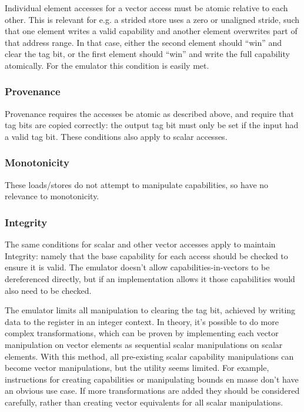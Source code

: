 Individual element accesses for a vector access must be atomic relative to each other.
This is relevant for e.g. a strided store uses a zero or unaligned stride, such that one element writes a valid capability and another element overwrites part of that address range.
In that case, either the second element should ``win'' and clear the tag bit, or the first element should ``win'' and write the full capability atomically.
For the emulator this condition is easily met.

\subsubsection*{Provenance}
Provenance requires the accesses be atomic as described above, and require that tag bits are copied correctly: the output tag bit must only be set if the input had a valid tag bit.
These conditions also apply to scalar accesses.

\subsubsection*{Monotonicity}
These loads/stores do not attempt to manipulate capabilities, so have no relevance to monotonicity.

\subsubsection*{Integrity}
The same conditions for scalar and other vector accesses apply to maintain Integrity: namely that the base capability for each access should be checked to ensure it is valid.
The emulator doesn't allow capabilities-in-vectors to be dereferenced directly, but if an implementation allows it those capabilities would also need to be checked.

The emulator limits all manipulation to clearing the tag bit, achieved by writing data to the register in an integer context.
In theory, it's possible to do more complex transformations, which can be proven by implementing each vector manipulation on vector elements as sequential scalar manipulations on scalar elements.
With this method, all pre-existing scalar capability manipulations can become vector manipulations, but the utility seems limited.
For example, instructions for creating capabilities or manipulating bounds en masse don't have an obvious use case.
If more transformations are added they should be considered carefully, rather than creating vector equivalents for all scalar manipulations.

